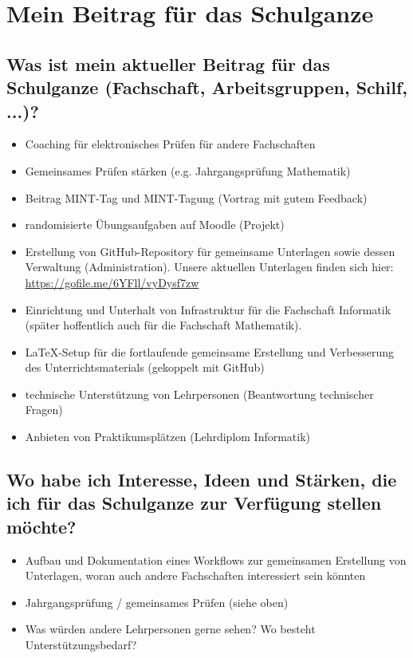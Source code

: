 \section{Mein Beitrag für das Schulganze}
\subsection{Was ist mein aktueller Beitrag für das Schulganze (Fachschaft, Arbeitsgruppen,
	Schilf, ...)?}
\begin{itemize}
	\item Coaching für elektronisches Prüfen für andere Fachschaften
	\item Gemeinsames Prüfen stärken (e.g. Jahrgangsprüfung Mathematik)
	\item Beitrag MINT-Tag und MINT-Tagung (Vortrag mit gutem Feedback)
	\item randomisierte Übungsaufgaben auf Moodle (Projekt)
	\item Erstellung von GitHub-Repository für gemeinsame Unterlagen sowie dessen Verwaltung (Administration). Unsere aktuellen Unterlagen finden sich hier: \url{https://gofile.me/6YFll/vyDysf7zw}
	\item Einrichtung und Unterhalt von Infrastruktur für die Fachschaft Informatik (später hoffentlich auch für die Fachschaft Mathematik).
	\item \LaTeX-Setup für die fortlaufende gemeinsame Erstellung und Verbesserung des Unterrichtsmaterials (gekoppelt mit GitHub)
	\item technische Unterstützung von Lehrpersonen (Beantwortung technischer Fragen)
	\item Anbieten von Praktikumsplätzen (Lehrdiplom Informatik)
\end{itemize}
\subsection{Wo habe ich Interesse, Ideen und Stärken, die ich für das Schulganze zur Verfügung stellen möchte?}
\begin{itemize}
	\item Aufbau und Dokumentation eines Workflows zur gemeinsamen Erstellung von Unterlagen, woran auch andere Fachschaften interessiert sein könnten
	\item Jahrgangsprüfung / gemeinsames Prüfen (siehe oben)
	\item Was würden andere Lehrpersonen gerne sehen? Wo besteht Unterstützungsbedarf?
\end{itemize}


